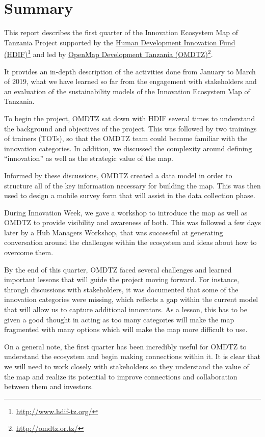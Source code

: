 \documentclass[a4paper,12pt,twoside]{article}
\begin{document}
\newpage
\tableofcontents
\newpage
\section{Summary}
This report describes the first quarter of the Innovation Ecosystem Map of Tanzania Project supported by the \href{http://www.hdif-tz.org/}{Human Development Innovation Fund (HDIF)}\footnote{\url{http://www.hdif-tz.org/}} and led by \href{http://omdtz.or.tz/}{OpenMap Development Tanzania (OMDTZ)}\footnote{\url{http://omdtz.or.tz/}}.
\bigskip

It provides an in-depth description of the activities done from January to March of 2019, what we have learned so far from the engagement with stakeholders and an evaluation of the sustainability models of the Innovation Ecosystem Map of Tanzania. 
\bigskip

To begin the project, OMDTZ sat down with HDIF several times to understand the background and objectives of the project. This was followed by two trainings of trainers (TOTs), so that the OMDTZ team could become familiar with the innovation categories. In addition, we discussed the complexity around defining “innovation” as well as the strategic value of the map.
\bigskip

Informed by these discussions, OMDTZ created a data model in order to structure all of the key information necessary for building the map. This was then used to design a mobile survey form that will assist in the data collection phase.
\bigskip

During Innovation Week, we gave a workshop to introduce the map as well as OMDTZ to provide visibility and awareness of both. This was followed a few days later by a Hub Managers Workshop, that was successful at generating conversation around the challenges within the ecosystem and ideas about how to overcome them.
\bigskip

By the end of this quarter, OMDTZ faced several challenges and learned important lessons that will guide the project moving forward. For instance, through discussions with stakeholders, it was documented that some of the innovation categories were missing, which reflects a gap within the current model that will allow us to capture additional innovators. As a lesson, this has to be given a good thought in acting as too many categories will make the map fragmented with many options which will make the map more difficult to use.
\bigskip

On a general note, the first quarter has been incredibly useful for OMDTZ to understand the ecosystem and begin making connections within it. It is clear that we will need to work closely with stakeholders so they understand the value of the map and realize its potential to improve connections and collaboration between them and investors. 
\end{document}
